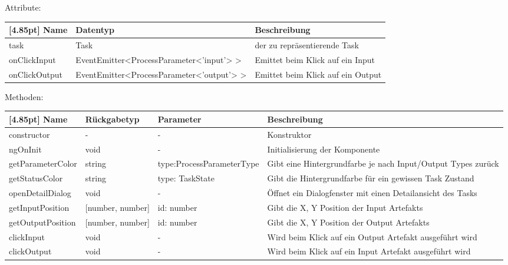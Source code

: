 				Attribute:
				\begin{center}
					\renewcommand{\arraystretch}{1.5}
					\setlength\tabcolsep{5pt}
					\begin{tabularx}{\textwidth}{|l|l|X|}
						\hline
						\rowcolor[gray]{0.75}[4.85pt]					
						Name & Datentyp & Beschreibung \\ \hline
						task & Task & der zu repräsentierende Task \\ \hline
						onClickInput & EventEmitter<ProcessParameter<'input'> > & Emittet beim Klick auf ein Input  \\ \hline
						onClickOutput & EventEmitter<ProcessParameter<'output'> > & Emittet beim Klick auf ein Output \\ \hline
					\end{tabularx}
				\end{center}
				
				Methoden:
				\begin{center}
				\setlength\tabcolsep{5pt}
					\renewcommand{\arraystretch}{1.5}
						\begin{tabularx}{\textwidth}{|l|l|p{40mm}|X|}
						\hline
						\rowcolor[gray]{0.75}[4.85pt]
						Name & Rückgabetyp & Parameter & Beschreibung \\ \hline
						constructor & - & - & Konstruktor \\ \hline
						ngOnInit & void & - & Initialisierung der Komponente \\ \hline
						getParameterColor & string & type:\newline ProcessParameterType & Gibt eine Hintergrundfarbe je nach Input/Output Types zurück \\ \hline
						getStatusColor & string & type: TaskState & Gibt die Hintergrundfarbe für ein gewissen Task Zustand \\ \hline
						openDetailDialog & void & - & Öffnet ein Dialogfenster mit einen Detailansicht des Tasks \\ \hline
						getInputPosition & [number, number] & id: number & Gibt die X, Y Position der Input Artefakts \\ \hline
						getOutputPosition & [number, number] & id: number & Gibt die X, Y Position der Output Artefakts \\ \hline
						clickInput & void & - & Wird beim Klick auf ein Output Artefakt ausgeführt wird \\ \hline
						clickOutput & void & - & Wird beim Klick auf ein Input Artefakt ausgeführt wird \\ \hline
						\end{tabularx}
				\end{center}
			
